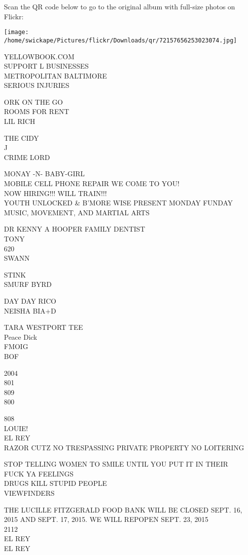 \documentclass[10pt,letterpaper]{article}
\begin{document}
Scan the QR code below to go to the original album with full-size photos on Flickr:

\texttt{[image: /home/swickape/Pictures/flickr/Downloads/qr/72157656253023074.jpg]}
\pagebreak

YELLOWBOOK.COM\\
SUPPORT L BUSINESSES\\
METROPOLITAN BALTIMORE\\
SERIOUS INJURIES

ORK ON THE GO\\
ROOMS FOR RENT\\
LIL RICH

THE CIDY\\
J\\
CRIME LORD

MONAY {-}N{-} BABY{-}GIRL\\
MOBILE CELL PHONE REPAIR WE COME TO YOU!\\
NOW HIRING!!! WILL TRAIN!!!\\
YOUTH UNLOCKED \& B'MORE WISE PRESENT MONDAY FUNDAY MUSIC, MOVEMENT, AND MARTIAL ARTS

DR KENNY A HOOPER FAMILY DENTIST\\
TONY\\
620\\
SWANN

STINK\\
SMURF BYRD

DAY DAY RICO\\
NEISHA BIA+D

TARA WESTPORT TEE\\
Peace Dick\\
FMOIG\\
BOF

2004\\
801\\
809\\
800

808\\
LOUIE!\\
EL REY\\
RAZOR CUTZ NO TRESPASSING PRIVATE PROPERTY NO LOITERING

STOP TELLING WOMEN TO SMILE UNTIL YOU PUT IT IN THEIR\\
FUCK YA FEELINGS\\
DRUGS KILL STUPID PEOPLE\\
VIEWFINDERS

THE LUCILLE FITZGERALD FOOD BANK WILL BE CLOSED SEPT. 16, 2015 AND SEPT. 17, 2015.  WE WILL REPOPEN SEPT. 23, 2015\\
2112\\
EL REY\\
EL REY
\end{document}
